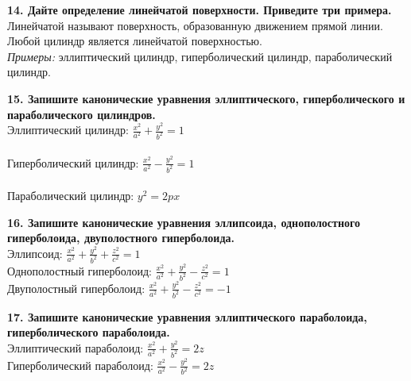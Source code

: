 \documentclass[11pt,a4paper]{article}
\begin{document}
\textbf{14. Дайте определение линейчатой поверхности. Приведите три примера.\\}
Линейчатой называют поверхность, образованную движением прямой линии.
\\
Любой цилиндр является линейчатой поверхностью.
\\
\textit{Примеры:} эллиптический цилиндр, гиперболический цилиндр, параболический цилиндр.

\textbf{15. Запишите канонические уравнения эллиптического, гиперболического и параболического цилиндров.\\}
Эллиптический цилиндр: $\frac{x^2}{a^2} + \frac{y^2}{b^2} = 1$
\\
\\
Гиперболический цилиндр: $\frac{x^2}{a^2} - \frac{y^2}{b^2} = 1$
\\
\\
Параболический цилиндр: $y^2 = 2px$

\textbf{16. Запишите канонические уравнения эллипсоида, однополостного гиперболоида, двуполостного гиперболоида.\\}
Эллипсоид: $\frac{x^2}{a^2} + \frac{y^2}{b^2} + \frac{z^2}{c^2} = 1$
\\
Однополостный гиперболоид: $\frac{x^2}{a^2} + \frac{y^2}{b^2} - \frac{z^2}{c^2} = 1$
\\
Двуполостный гиперболоид: $\frac{x^2}{a^2} + \frac{y^2}{b^2} - \frac{z^2}{c^2} = -1$

\textbf{17. Запишите канонические уравнения эллиптического параболоида, гиперболического параболоида.\\}
Эллиптический параболоид: $\frac{x^2}{a^2} + \frac{y^2}{b^2} = 2z$
\\
Гиперболический параболоид: $\frac{x^2}{a^2} - \frac{y^2}{b^2} = 2z$
\end{document}
